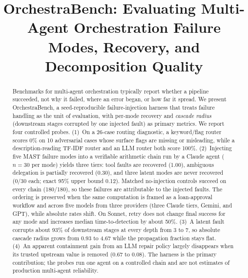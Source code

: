 \documentclass[11pt,a4paper]{article}
\title[OrchestraBench]{OrchestraBench: Evaluating Multi-Agent Orchestration
Failure Modes, Recovery, and Decomposition Quality}
\begin{document}
\maketitle

\begin{abstract}
Benchmarks for multi-agent orchestration typically report whether a pipeline
succeeded, not why it failed, where an error began, or how far it spread. We
present OrchestraBench, a seed-reproducible failure-injection harness that
treats failure handling as the unit of evaluation, with per-mode recovery and
\emph{cascade radius} (downstream stages corrupted by one injected fault) as
primary metrics. We report four controlled probes. (1)~On a 26-case routing
diagnostic, a keyword/flag router scores 0\% on 10 adversarial cases whose
surface flags are missing or misleading, while a description-reading TF-IDF
router and an LLM router both score 100\%. (2)~Injecting five MAST failure modes
into a verifiable arithmetic chain run by a Claude agent ($n{=}30$ per mode)
yields three tiers: tool faults are recovered (1.00), ambiguous delegation is
partially recovered (0.30), and three latent modes are never recovered (0/30
each; exact 95\% upper bound 0.12). Matched no-injection controls succeed on
every chain (180/180), so these failures are attributable to the injected faults.
The ordering is preserved when the same computation is framed as a loan-approval
workflow and across five models from three providers (three Claude tiers,
Gemini, and GPT), while absolute rates shift. On Sonnet, retry does
not change final success for any mode and increases median time-to-detection
by about 50\%. (3)~A latent fault corrupts about 93\% of downstream stages at
every depth from 3 to 7, so absolute cascade radius grows from 0.93 to 4.67
while the propagation fraction stays flat. (4)~An apparent containment gain from
an LLM repair policy largely disappears when its trusted upstream value is
removed (0.67 to 0.08). The harness is the primary contribution; the probes run
one agent on a controlled chain and are not estimates of production multi-agent
reliability.
\end{abstract}
\end{document}
